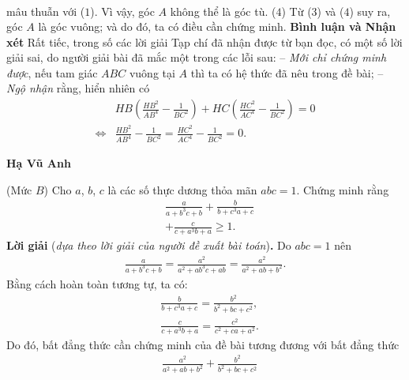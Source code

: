 \begin{multicols}{2}
\begin{align*}
	\end{align*}
	mâu thuẫn với ($1$). Vì vậy, góc $A$ không thể là góc tù.  \hfill ($4$)
	\vskip 0.05cm
	Từ ($3$) và ($4$) suy ra, góc $A$ là góc vuông; và do đó, ta có điều cần chứng minh.
	\vskip 0.05cm
	\textbf{\color{thachthuctoanhoc}Bình luận và Nhận xét}
	\vskip 0.05cm
	Rất tiếc, trong số các lời giải Tạp chí đã nhận được từ bạn đọc, có một số lời giải sai, do người giải bài đã mắc một trong các lỗi sau:
	\vskip 0.05cm
	-- \textit{Mới chỉ chứng minh được}, nếu tam giác $ABC$ vuông tại $A$ thì ta có hệ thức đã nêu trong đề bài;
	\vskip 0.05cm
	-- \textit{Ngộ nhận} rằng, hiển nhiên có
	\begin{align*}
		&HB\!\left(\!\!\!\frac{{H{B^2}}}{{A{B^4}}} \!-\! \frac{1}{{B{C^2}}}\!\!\! \right)\!\!+\! HC \! \left(\!\!\!\frac{{H{C^2}}}{{A{C^4}}} \!-\! \frac{1}{{B{C^2}}} \!\!\!\right) \!\!=\! 0\\
		\Leftrightarrow &\frac{{H{B^2}}}{{A{B^4}}} - \frac{1}{{B{C^2}}} = \frac{{H{C^2}}}{{A{C^4}}} - \frac{1}{{B{C^2}}} = 0.
	\end{align*}
	\begin{flushright}
		\textbf{\color{thachthuctoanhoc}Hạ Vũ Anh}
	\end{flushright}
	{}
	(Mức $B$)
	Cho $a$, $b$, $c$ là các số thực dương thỏa mãn $abc = 1$. Chứng minh rằng
	\begin{align*}
		&\frac{a}{{a + {b^3}c + b}} + \frac{b}{{b + {c^3}a + c}} \\
		&+ \frac{c}{{c + {a^3}b + a}} \ge 1.
	\end{align*}
	\textbf{\color{thachthuctoanhoc}Lời giải} (\textit{dựa theo lời giải của người đề xuất bài toán})\textbf{\color{thachthuctoanhoc}.}
	\vskip 0.05cm
	Do $abc = 1$ nên
	\begin{align*}
		\frac{a}{{a \!+\! {b^3}c \!+\! b}} \!=\! \frac{{{a^2}}}{{{a^2} \!+\! a{b^3}c \!+\! ab}} \!=\! \frac{{{a^2}}}{{{a^2} \!+\! ab \!+\! {b^2}}}.
	\end{align*}
	Bằng cách hoàn toàn tương tự, ta có:
	\begin{align*}
		&\frac{b}{{b + {c^3}a + c}} = \frac{{{b^2}}}{{{b^2} + bc + {c^2}}},\\ &\frac{c}{{c + {a^3}b + a}} = \frac{{{c^2}}}{{{c^2} + ca + {a^2}}}.
	\end{align*}
	Do đó, bất đẳng thức cần chứng minh của đề bài tương đương với bất đẳng thức
	\begin{align*}
		&\frac{{{a^2}}}{{{a^2} + ab + {b^2}}} + \frac{{{b^2}}}{{{b^2} + bc + {c^2}}} \\

\end{align*}
\end{multicols}
